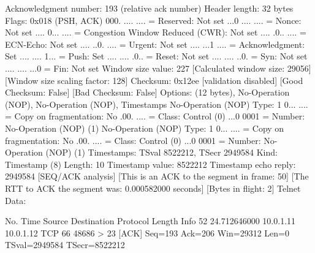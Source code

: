     Acknowledgment number: 193    (relative ack number)
    Header length: 32 bytes
    Flags: 0x018 (PSH, ACK)
        000. .... .... = Reserved: Not set
        ...0 .... .... = Nonce: Not set
        .... 0... .... = Congestion Window Reduced (CWR): Not set
        .... .0.. .... = ECN-Echo: Not set
        .... ..0. .... = Urgent: Not set
        .... ...1 .... = Acknowledgment: Set
        .... .... 1... = Push: Set
        .... .... .0.. = Reset: Not set
        .... .... ..0. = Syn: Not set
        .... .... ...0 = Fin: Not set
    Window size value: 227
    [Calculated window size: 29056]
    [Window size scaling factor: 128]
    Checksum: 0x12ee [validation disabled]
        [Good Checksum: False]
        [Bad Checksum: False]
    Options: (12 bytes), No-Operation (NOP), No-Operation (NOP), Timestamps
        No-Operation (NOP)
            Type: 1
                0... .... = Copy on fragmentation: No
                .00. .... = Class: Control (0)
                ...0 0001 = Number: No-Operation (NOP) (1)
        No-Operation (NOP)
            Type: 1
                0... .... = Copy on fragmentation: No
                .00. .... = Class: Control (0)
                ...0 0001 = Number: No-Operation (NOP) (1)
        Timestamps: TSval 8522212, TSecr 2949584
            Kind: Timestamp (8)
            Length: 10
            Timestamp value: 8522212
            Timestamp echo reply: 2949584
    [SEQ/ACK analysis]
        [This is an ACK to the segment in frame: 50]
        [The RTT to ACK the segment was: 0.000582000 seconds]
        [Bytes in flight: 2]
Telnet
    Data: 

No.     Time           Source                Destination           Protocol Length Info
     52 24.712646000   10.0.1.11             10.0.1.12             TCP      66     48686 > 23 [ACK] Seq=193 Ack=206 Win=29312 Len=0 TSval=2949584 TSecr=8522212

